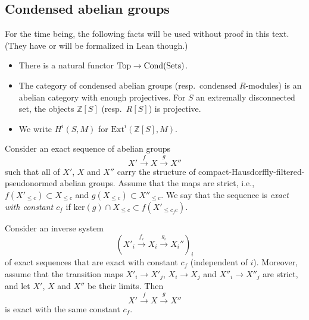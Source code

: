 \subsection{Condensed abelian groups}

\begin{remark}
  For the time being, the following facts will be used without proof in this text.
  (They have or will be formalized in Lean though.)

  \begin{itemize}
    \item There is a natural functor $\operatorname{Top} \to \operatorname{Cond}(\operatorname{Sets})$.
    \item The category of condensed abelian groups (resp.~condensed $R$-modules)
      is an abelian category with enough projectives.
      For $S$ an extremally disconnected set, the objects $\mathbb Z[S]$ (resp.~$R[S]$) is projective.
    \item We write $H^i(S, M)$ for $\text{Ext}^i(\mathbb Z[S], M)$.
  \end{itemize}
\end{remark}

\begin{definition}
  \label{exact-with-constant}
  \leanok
  Consider an exact sequence of abelian groups
  \[ X'\xrightarrow{f} X\xrightarrow{g} X'' \]
  such that all of $X'$, $X$ and $X''$ carry the structure of compact-Hausdorffly-filtered-pseudonormed abelian groups.
  Assume that the maps are strict, i.e., $f(X'_{\leq c})\subset X_{\leq c}$ and $g(X_{\leq c})\subset X''_{\leq c}$.
  We say that the sequence is \emph{exact with constant $c_f$} if
  $\mathrm{ker}(g)\cap X_{\leq c}\subset f(X'_{\leq c_fc})$.
\end{definition}

\begin{proposition}
  \label{exact-with-constants-lim}
  \leanok
  Consider an inverse system
  \[ (X'_i\xrightarrow{f_i} X_i\xrightarrow{g_i} X_i'')_i \]
  of exact sequences that are exact with constant $c_f$ (independent of $i$).
  Moreover, assume that the transition maps $X'_i\to X'_j$, $X_i\to X_j$ and $X''_i\to X''_j$ are strict, and let $X'$, $X$ and $X''$ be their limits.
  Then
  \[ X'\xrightarrow{f} X\xrightarrow{g} X'' \]
  is exact with the same constant $c_f$.
\end{proposition}

